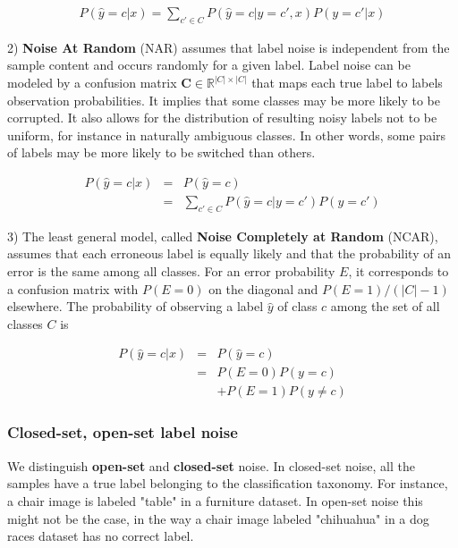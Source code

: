 \begin{eqnarray}
P(\hat{y}=c|x)=\sum_{c' \in C} P(\hat{y}=c|y=c',x)P(y=c'|x)
\end{eqnarray}

2) \textbf{Noise At Random} (NAR) assumes that label noise is independent from the sample content and occurs randomly for a given label. Label noise can be modeled by a confusion matrix $\textbf{C} \in \mathbb{R}^{|C|\times|C|}$ that maps each true label to labels observation probabilities. It implies that some classes may be more likely to be corrupted. It also allows for the distribution of resulting noisy labels not to be uniform, for instance in naturally ambiguous classes. In other words, some pairs of labels may be more likely to be switched than others.

\begin{eqnarray}
P(\hat{y}=c|x) &=& P(\hat{y}=c)  \nonumber \\
~ &=& \sum_{c' \in C} P(\hat{y}=c|y=c')P(y=c')
\end{eqnarray}

3) The least general model, called \textbf{Noise Completely at Random} (NCAR), assumes that each erroneous label is equally likely and that the probability of an error is the same among all classes. For an error probability $E$, it corresponds to a confusion matrix with $P(E=0)$ on the diagonal and $P(E=1) / (|C| - 1)$ elsewhere. The probability of observing a label $\hat{y}$ of class $c$ among the set of all classes $C$ is

\begin{eqnarray}
P(\hat{y}=c|x) &=& P(\hat{y}=c)  \nonumber \\
~ &=& P(E=0)P(y=c) \nonumber \\
~ && + P(E=1)P(y \neq c)
\end{eqnarray}


\subsubsection{Closed-set, open-set label noise}

We distinguish \textbf{open-set} and \textbf{closed-set} noise. In closed-set noise, all the samples have a true label belonging to the classification taxonomy. For instance, a chair image is labeled "table" in a furniture dataset. In open-set noise this might not be the case, in the way a chair image labeled "chihuahua" in a dog races dataset has no correct label.

